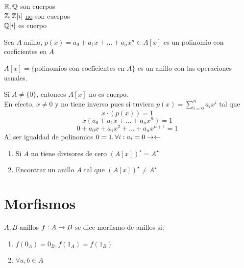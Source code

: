     \begin{ejm}
        $\mathbb{R},\mathbb{Q}$ son cuerpos\\
        $\mathbb{Z},\mathbb{Z}[i]$ \underline{no} son cuerpos\\
        $\mathbb{Q}[i]$ es cuerpo
    \end{ejm}

    \begin{defn}
        Sea $A$ anillo, $p(x)=a_0+a_1x+...+a_nx^n\in A[x]$ es un polinomio con coeficientes en $A$
    \end{defn}

    \begin{prop}
        $A[x]=\{\text{polinomios con coeficientes en }A\}$ es un anillo con las operaciones usuales.
    \end{prop}

    \begin{obs}
        Si $A\neq\{0\}$, entonces $A[x]$ no es cuerpo.\\
        En efecto, $x\neq 0$ y no tiene inverso pues si tuviera $p(x)=\sum^n_{i=0}a_ix^i$ tal que
        \[x\cdot(p(x))=1\]
        \[x(a_0+a_1x+...+a_nx^n)=1\]
        \[0+a_0x+a_1x^2+...+a_nx^{n+1}=1\]
        Al ser igualdad de polinomios $0=1,\forall i:a_i=0\rightarrow\leftarrow$
    \end{obs}

    \begin{eje}
        \begin{enumerate}
            \item Si $A$ no tiene divisores de cero $(A[x])^\star=A^\star$

            \item Encontrar un anillo $A$ tal que $(A[x])^\star\neq A^\star$
        \end{enumerate}
    \end{eje}

    \section{Morfismos}
    $A,B$ anillos $f:A\xrightarrow[]{}B$ se dice morfismo de anillos si:
    \begin{enumerate}
        \item $f(0_A)=0_B, f(1_A)=f(1_B)$

        \item $\forall a,b\in A$
    \end{enumerate}


